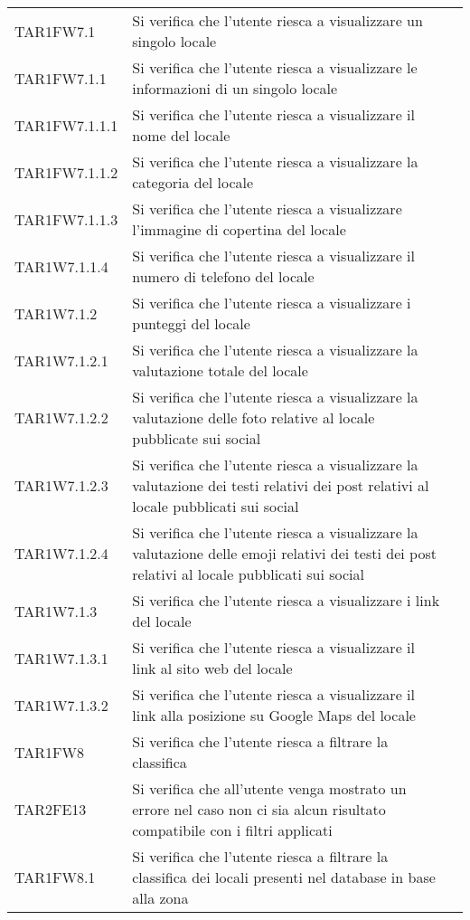 \begin{longtable}{ m{}<{\centering}  m{}<{\centering}  m{}<{\centering} }
	TAR1FW7.1 & Si verifica che l'utente riesca a visualizzare un singolo locale & \Ni \\
	TAR1FW7.1.1 & Si verifica che l'utente riesca a visualizzare le informazioni di un singolo locale & \Ni \\
	TAR1FW7.1.1.1 & Si verifica che l'utente riesca a visualizzare il nome del locale & \Ni \\
	TAR1FW7.1.1.2 & Si verifica che l'utente riesca a visualizzare la categoria del locale & \Ni \\
	TAR1FW7.1.1.3 & Si verifica che l'utente riesca a visualizzare l'immagine di copertina del locale & \Ni \\
	TAR1W7.1.1.4 & Si verifica che l'utente riesca a visualizzare il numero di telefono del locale & \Ni \\
	TAR1W7.1.2 & Si verifica che l'utente riesca a visualizzare i punteggi del locale & \Ni \\
	TAR1W7.1.2.1 & Si verifica che l'utente riesca a visualizzare la valutazione totale del locale & \Ni \\
	TAR1W7.1.2.2	& Si verifica che l'utente riesca a visualizzare la valutazione delle foto relative al locale pubblicate sui social & \Ni \\
	TAR1W7.1.2.3	& Si verifica che l'utente riesca a visualizzare la valutazione dei testi relativi dei post relativi al locale pubblicati sui social & \Ni \\
	TAR1W7.1.2.4	& Si verifica che l'utente riesca a visualizzare la valutazione delle emoji relativi dei testi dei post relativi al locale pubblicati sui social & \Ni \\
	TAR1W7.1.3	& Si verifica che l'utente riesca a visualizzare i link del locale & \Ni \\
	TAR1W7.1.3.1 & Si verifica che l'utente riesca a visualizzare il link al sito web del locale & \Ni \\
	TAR1W7.1.3.2 & Si verifica che l'utente riesca a visualizzare il link alla posizione su Google Maps del locale & \Ni \\
	TAR1FW8 & Si verifica che l'utente riesca a filtrare la classifica & \Ni \\
	TAR2FE13 & Si verifica che all'utente venga mostrato un errore nel caso non ci sia alcun risultato compatibile con i filtri applicati & \Ni \\
	TAR1FW8.1 & Si verifica che l'utente riesca a filtrare la classifica dei locali presenti nel database in base alla zona & \Ni \\

\end{longtable}
